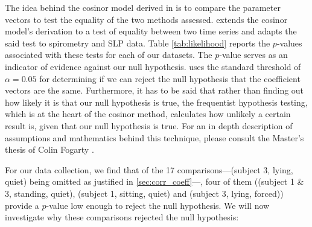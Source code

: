 The idea behind the cosinor model derived in \cite{fogarty2011slp} is to compare the parameter vectors to test the equality of the two methods assessed. \cite{fogarty2011slp} extends the cosinor model's derivation to a test of equality between two time series and adapts the said test to spirometry and SLP data.
Table \ref{tab:likelihood} reports the $p$-values associated with these tests for each of our datasets. The $p$-value serves as an indicator of evidence against our null hypothesis. \cite{fogarty2011slp} uses the standard threshold of $\alpha=0.05$ for determining if we can reject the null hypothesis that the coefficient vectors are the same. Furthermore, it has to be said that rather than finding out how likely it is that our null hypothesis is true, the frequentist hypothesis testing, which is at the heart of the cosinor method, calculates how unlikely a certain result is, given that our null hypothesis is true.
For an in depth description of assumptions and mathematics behind this technique, please consult the Master's thesis of Colin Fogarty \cite{fogarty2011slp}.

For our data collection, we find that of the 17 comparisons---(subject 3, lying, quiet) being omitted as justified in \ref{sec:corr_coeff}---, four of them ((subject 1 \& 3, standing, quiet), (subject 1, sitting, quiet) and (subject 3, lying, forced)) provide a $p$-value low enough to reject the null hypothesis. We will now investigate why these comparisons rejected the null hypothesis:

